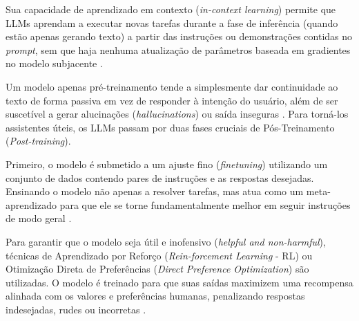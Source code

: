 \documentclass[
    12pt,                %
    openright,           %
    oneside,             %
    a4paper,             %
    english,             %
    brazil               %
]{abntex2}
\begin{document}
\begin{itemize}
Sua capacidade de aprendizado em contexto (\textit{in-context learning}) permite que LLMs aprendam a executar novas tarefas durante a fase de inferência (quando estão apenas gerando texto) a partir das instruções ou demonstrações contidas no \textit{prompt}, sem que haja nenhuma atualização de parâmetros baseada em gradientes no modelo subjacente \cite{jurafsky2026speech}.
\par
Um modelo apenas pré-treinamento tende a simplesmente dar continuidade ao texto de forma passiva em vez de responder à intenção do usuário, além de ser suscetível a gerar alucinações (\textit{hallucinations}) ou saída inseguras \cite{jurafsky2026speech}.
Para torná-los assistentes úteis, os LLMs passam por duas fases cruciais de Pós-Treinamento (\textit{Post-training}).
\par
Primeiro, o modelo é submetido a um ajuste fino (\textit{finetuning}) utilizando um conjunto de dados contendo pares de instruções e as respostas desejadas.
Ensinando o modelo não apenas a resolver tarefas, mas atua como um meta-aprendizado para que ele se torne fundamentalmente melhor em seguir instruções de modo geral \cite{jurafsky2026speech}.
\par
Para garantir que o modelo seja útil e inofensivo (\textit{helpful and non-harmful}), técnicas de Aprendizado por Reforço (\textit{Rein-forcement Learning} - RL) ou Otimização Direta de Preferências (\textit{Direct Preference Optimization}) são utilizadas.
O modelo é treinado para que suas saídas maximizem uma recompensa alinhada com os valores e preferências humanas, penalizando respostas indesejadas, rudes ou incorretas \cite{jurafsky2026speech}.


\end{itemize}
\end{document}
